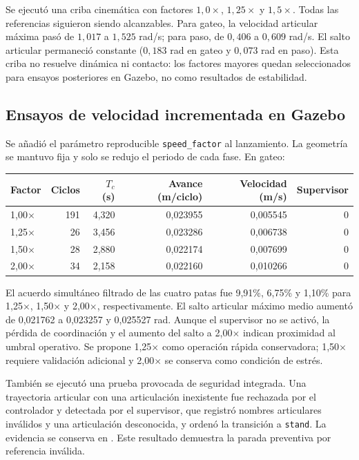 Se ejecutó una criba cinemática con factores $1{,}0\times$, $1{,}25\times$ y
$1{,}5\times$. Todas las referencias siguieron siendo alcanzables. Para gateo,
la velocidad articular máxima pasó de $1{,}017$ a $1{,}525$ rad/s; para paso,
de $0{,}406$ a $0{,}609$ rad/s. El salto articular permaneció constante
($0{,}183$ rad en gateo y $0{,}073$ rad en paso). Esta criba no resuelve
dinámica ni contacto: los factores mayores quedan seleccionados para ensayos
posteriores en Gazebo, no como resultados de estabilidad.

\subsection{Ensayos de velocidad incrementada en Gazebo}

Se añadió el parámetro reproducible \texttt{speed\_factor} al lanzamiento. La
geometría se mantuvo fija y solo se redujo el periodo de cada fase. En gateo:

\begin{center}
\begin{tabular}{lrrrrr}
Factor & Ciclos & $T_c$ (s) & Avance (m/ciclo) & Velocidad (m/s) & Supervisor \\
\hline
1,00$\times$ & 191 & 4,320 & 0,023955 & 0,005545 & 0 \\
1,25$\times$ & 26 & 3,456 & 0,023286 & 0,006738 & 0 \\
1,50$\times$ & 28 & 2,880 & 0,022174 & 0,007699 & 0 \\
2,00$\times$ & 34 & 2,158 & 0,022160 & 0,010266 & 0 \\
\end{tabular}
\end{center}

El acuerdo simultáneo filtrado de las cuatro patas fue 9,91\%, 6,75\% y
1,10\% para 1,25$\times$, 1,50$\times$ y 2,00$\times$, respectivamente. El
salto articular máximo medio aumentó de 0,021762 a 0,023257 y 0,025527 rad.
Aunque el supervisor no se activó, la pérdida de coordinación y el aumento del
salto a 2,00$\times$ indican proximidad al umbral operativo. Se propone
1,25$\times$ como operación rápida conservadora; 1,50$\times$ requiere
validación adicional y 2,00$\times$ se conserva como condición de estrés.

También se ejecutó una prueba provocada de seguridad integrada. Una trayectoria
articular con una articulación inexistente fue rechazada por el
controlador y detectada por el supervisor, que registró nombres articulares
inválidos y una articulación desconocida, y ordenó la transición a
\texttt{stand}. La evidencia se conserva en
. Este resultado
demuestra la parada preventiva por referencia inválida.

